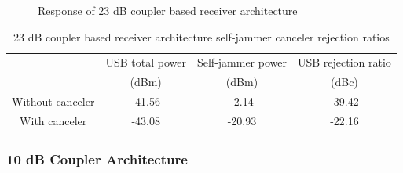 \documentclass[12pt,onecolumn,titlepage]{article}
\begin{document}
\begin{figure}[ht]
	\centering
		\quad
	\label{fig:orig_Rx_23dBcoup}
	\caption{Response of 23 dB coupler based receiver architecture}
\end{figure}

\begin{table}[h!]
\centering
	\caption{23 dB coupler based receiver architecture self-jammer canceler rejection ratios}
	\begin{tabular}{| c | c | c || c |}
	\hline
	 & USB total power & Self-jammer power  & USB rejection ratio  \\
	 & (dBm) & (dBm) & (dBc) \\ \hline
	 Without canceler & -41.56 & -2.14 & -39.42 \\ \hline
	 With canceler & -43.08 & -20.93 & -22.16 \\ \hline
	\end{tabular}
\label{tab:orig_Rx_architecture_rejection_23dBcoup}
\end{table}


\subsubsection{10 dB Coupler Architecture}
\end{document}
